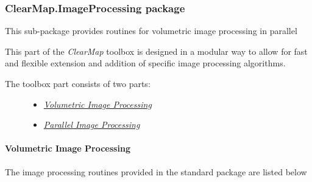 \documentclass[letterpaper,10pt,english]{sphinxmanual}
\begin{document}
\subsubsection{ClearMap.ImageProcessing package}
\label{api/ClearMap.ImageProcessing:clearmap-imageprocessing-package}\label{api/ClearMap.ImageProcessing::doc}\label{api/ClearMap.ImageProcessing:module-ClearMap.ImageProcessing}
This sub-package provides routines for volumetric image processing in parallel

This part of the \emph{ClearMap} toolbox is designed in a modular way to allow for
fast and flexible extension and addition of specific image processing
algorithms.
\begin{description}
\item[{The toolbox part consists of two parts:}] \leavevmode\begin{itemize}
\item {} 
{\hyperref[api/ClearMap.ImageProcessing:volumetric-image-processing]{\emph{Volumetric Image Processing}}}

\item {} 
{\hyperref[api/ClearMap.ImageProcessing:parallel-image-processing]{\emph{Parallel Image Processing}}}

\end{itemize}

\end{description}


\paragraph{Volumetric Image Processing}
\label{api/ClearMap.ImageProcessing:volumetric-image-processing}
The image processing routines provided in the standard package are listed below
\end{document}
